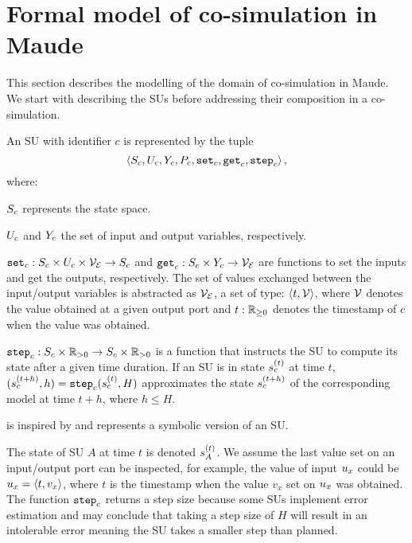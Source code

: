 \section{Formal model of co-simulation in Maude}
This section describes the modelling of the domain of co-simulation in Maude. We start with describing the SUs before addressing their composition in a co-simulation.

\begin{definition}\label{def:fmu}
  An SU with identifier $c$ is represented by the tuple
  $$ \left\langle S_{c}, U_{c}, Y_{c}, P_{c}, \mathtt{set}_{c}, \mathtt{get}_{c}, \mathtt{step}_{c} \right\rangle ,$$
  where:
  \begin{compactitem}
    \item $S_{c}$ represents the state space.
    \item $U_{c}$ and $Y_{c}$ the set of input and output variables, respectively. 
    \item $\mathtt{set}_{c} : S_{c} \times U_{c} \times \mathcal{V_{E}} \to S_{c}$ and $\mathtt{get}_{c}: S_{c} \times Y_{c} \to \mathcal{V_{E}}$ are functions to set the inputs and get the outputs, respectively. The set of values exchanged between the input/output variables is abstracted as $\mathcal{V_{E}}$, a set of type: $ \left\langle t, \mathcal{V} \right\rangle $, where $\mathcal{V}$ denotes the value obtained at a given output port and $t: \mathbb{R}_{\geq 0}$ denotes the timestamp of $c$ when the value was obtained.
    \item $\mathtt{step}_{c}: S_{c} \times \mathbb{R}_{> 0} \to S_{c} \times \mathbb{R}_{> 0} $ is a function that instructs the SU to compute its state after a given time duration. If an SU is in state $s_{c}^{(t)}$ at time $t$, $(s_{c}^{(t+h)}, h) = \mathtt{step}_{c}(s_{c}^{(t)}, H)$ approximates the state $s_{c}^{(t+h)}$ of the corresponding model at time $t+h$, where $h \leq H$. 
  \end{compactitem}
\end{definition}

 is inspired by \cite{Broman2013,Gomes2019c,thrane2021} and represents a symbolic version of an SU. 

The state of SU $A$ at time $t$ is denoted $s_{A}^{(t)}$.
We assume the last value set on an input/output port can be inspected, for example, the value of input $u_{x}$ could be $u_{x} =  \left\langle t, v_x \right\rangle $, where $t$ is the timestamp when the value $v_x$ set on $u_{x}$ was obtained.
The function $\mathtt{step}_{c}$ returns a step size because some SUs implement error estimation and may conclude that taking a step size of $H$ will result in an intolerable error meaning the SU takes a smaller step than planned.

